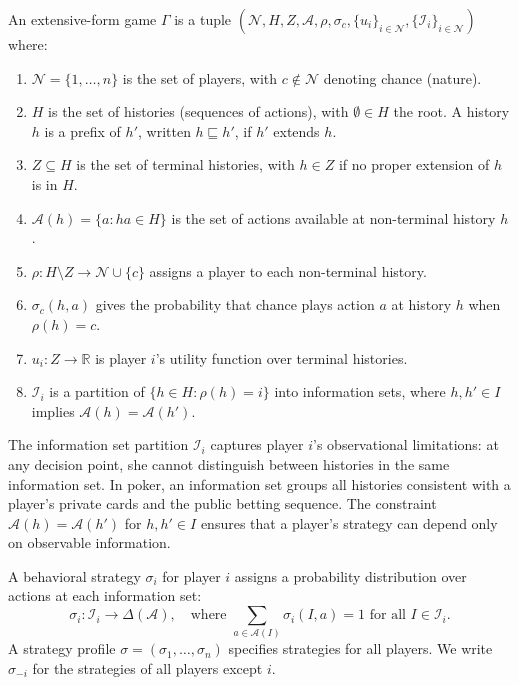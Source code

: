 \begin{definition}
An extensive-form game $\Gamma$ is a tuple $(\mathcal{N}, H, Z, \mathcal{A}, \rho, \sigma_c, \{u_i\}_{i \in \mathcal{N}}, \{\mathcal{I}_i\}_{i \in \mathcal{N}})$ where:
\begin{enumerate}
    \item $\mathcal{N} = \{1, \ldots, n\}$ is the set of players, with $c \notin \mathcal{N}$ denoting chance (nature).
    \item $H$ is the set of histories (sequences of actions), with $\emptyset \in H$ the root. A history $h$ is a prefix of $h'$, written $h \sqsubseteq h'$, if $h'$ extends $h$.
    \item $Z \subseteq H$ is the set of terminal histories, with $h \in Z$ if no proper extension of $h$ is in $H$.
    \item $\mathcal{A}(h) = \{a : ha \in H\}$ is the set of actions available at non-terminal history $h$.
    \item $\rho: H \setminus Z \to \mathcal{N} \cup \{c\}$ assigns a player to each non-terminal history.
    \item $\sigma_c(h, a)$ gives the probability that chance plays action $a$ at history $h$ when $\rho(h) = c$.
    \item $u_i: Z \to \mathbb{R}$ is player $i$'s utility function over terminal histories.
    \item $\mathcal{I}_i$ is a partition of $\{h \in H : \rho(h) = i\}$ into information sets, where $h, h' \in I$ implies $\mathcal{A}(h) = \mathcal{A}(h')$.
\end{enumerate}
\end{definition}

The information set partition $\mathcal{I}_i$ captures player $i$'s observational limitations: at any decision point, she cannot distinguish between histories in the same information set. In poker, an information set groups all histories consistent with a player's private cards and the public betting sequence. The constraint $\mathcal{A}(h) = \mathcal{A}(h')$ for $h, h' \in I$ ensures that a player's strategy can depend only on observable information.

\begin{definition}
A behavioral strategy $\sigma_i$ for player $i$ assigns a probability distribution over actions at each information set:
\begin{equation}
\sigma_i: \mathcal{I}_i \to \Delta(\mathcal{A}), \quad \text{where } \sum_{a \in \mathcal{A}(I)} \sigma_i(I, a) = 1 \text{ for all } I \in \mathcal{I}_i.
\end{equation}
A strategy profile $\sigma = (\sigma_1, \ldots, \sigma_n)$ specifies strategies for all players. We write $\sigma_{-i}$ for the strategies of all players except $i$.
\end{definition}

